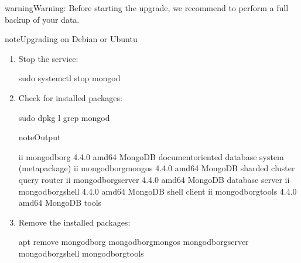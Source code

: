 \documentclass[letterpaper,10pt,english]{sphinxmanual}
\begin{document}
\begin{sphinxadmonition}{warning}{Warning:}
\sphinxAtStartPar
Before starting the upgrade, we recommend to perform a full
backup of your data.

\begin{sphinxadmonition}{note}{Upgrading on Debian or Ubuntu}
\begin{enumerate}
%
\item {} 
\sphinxAtStartPar
Stop the  service:

\begin{sphinxVerbatim}[commandchars=\\\{\}]
\PYGZdl{} sudo systemctl stop mongod
\end{sphinxVerbatim}

\item {} 
\sphinxAtStartPar
Check for installed packages:

\begin{sphinxVerbatim}[commandchars=\\\{\}]
\PYGZdl{} sudo dpkg \PYGZhy{}l  grep mongod
\end{sphinxVerbatim}

\begin{sphinxadmonition}{note}{Output}

\begin{sphinxVerbatim}[commandchars=\\\{\}]
ii  mongodb\PYGZhy{}org            4.4.0    amd64      MongoDB document\PYGZhy{}oriented database system (metapackage)
ii  mongodb\PYGZhy{}org\PYGZhy{}mongos     4.4.0    amd64      MongoDB sharded cluster query router
ii  mongodb\PYGZhy{}org\PYGZhy{}server     4.4.0    amd64      MongoDB database server
ii  mongodb\PYGZhy{}org\PYGZhy{}shell      4.4.0    amd64      MongoDB shell client
ii  mongodb\PYGZhy{}org\PYGZhy{}tools      4.4.0    amd64      MongoDB tools
\end{sphinxVerbatim}
\end{sphinxadmonition}

\item {} 
\sphinxAtStartPar
Remove the installed packages:

\begin{sphinxVerbatim}[commandchars=\\\{\}]
\PYGZdl{} apt remove mongodb\PYGZhy{}org mongodb\PYGZhy{}org\PYGZhy{}mongos mongodb\PYGZhy{}org\PYGZhy{}server 
\PYGZdl{} mongodb\PYGZhy{}org\PYGZhy{}shell mongodb\PYGZhy{}org\PYGZhy{}tools
\end{sphinxVerbatim}


\end{enumerate}
\end{sphinxadmonition}
\end{sphinxadmonition}
\end{document}
